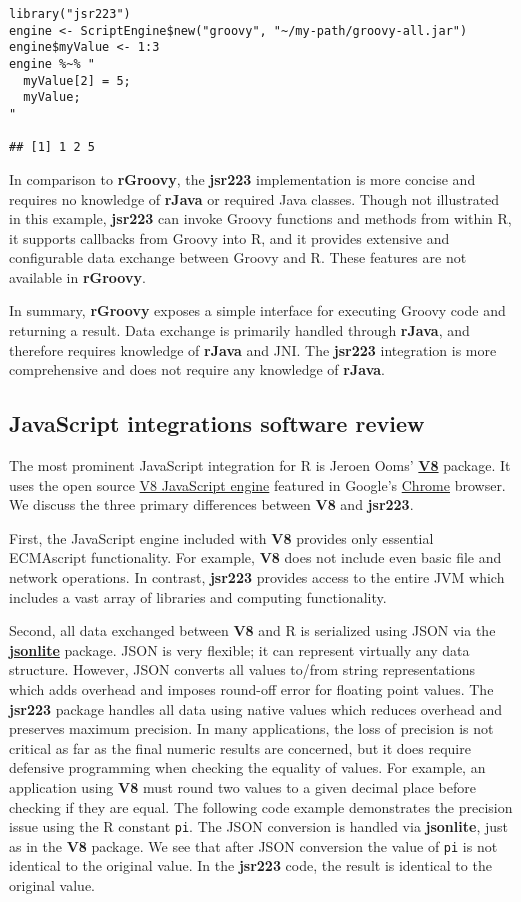 \documentclass[
article,
11pt, %
a4paper, %
oneside, %
headinclude,footinclude, %
]{scrartcl}
\theoremstyle{definition} %
\theoremstyle{plain} %
\theoremstyle{remark} %
\newcommand{\pkg}[1]{\textbf{#1}}
\newcommand{\CRANpkg}[1]{\href{https://CRAN.R-project.org/package=#1}{\pkg{#1}}}
\newcommand{\code}[1]{\texttt{#1}}
\begin{document}
\begin{verbatim}
library("jsr223")
engine <- ScriptEngine$new("groovy", "~/my-path/groovy-all.jar")
engine$myValue <- 1:3
engine %~% "
  myValue[2] = 5;
  myValue;
"

## [1] 1 2 5
\end{verbatim}

In comparison to \pkg{rGroovy}, the \pkg{jsr223} implementation is more concise and requires no knowledge of \pkg{rJava} or required Java classes. Though not illustrated in this example, \pkg{jsr223} can invoke Groovy functions and methods from within R, it supports callbacks from Groovy into R, and it provides extensive and configurable data exchange between Groovy and R. These features are not available in \pkg{rGroovy}.

In summary, \pkg{rGroovy} exposes a simple interface for executing Groovy code and returning a result. Data exchange is primarily handled through \pkg{rJava}, and therefore requires knowledge of \pkg{rJava} and JNI. The \pkg{jsr223} integration is more comprehensive and does not require any knowledge of \pkg{rJava}.

\hypertarget{javascript-integrations}{}
\subsection{JavaScript integrations software review}

The most prominent JavaScript integration for R is Jeroen Ooms' \CRANpkg{V8} package. It uses the open source \href{https://developers.google.com/v8/}{V8 JavaScript engine} featured in Google's \href{https://www.google.com/chrome/browser/features.html}{Chrome} browser. We discuss the three primary differences between \pkg{V8} and \pkg{jsr223}.

First, the JavaScript engine included with \pkg{V8} provides only essential ECMAscript functionality. For example, \pkg{V8} does not include even basic file and network operations. In contrast, \pkg{jsr223} provides access to the entire JVM which includes a vast array of libraries and computing functionality.

Second, all data exchanged between \pkg{V8} and R is serialized using JSON via the \CRANpkg{jsonlite} package. JSON is very flexible; it can represent virtually any data structure. However, JSON converts all values to/from string representations which adds overhead and imposes round-off error for floating point values. The \pkg{jsr223} package handles all data using native values which reduces overhead and preserves maximum precision. In many applications, the loss of precision is not critical as far as the final numeric results are concerned, but it does require defensive programming when checking the equality of values. For example, an application using \pkg{V8} must round two values to a given decimal place before checking if they are equal. The following code example demonstrates the precision issue using the R constant \code{pi}. The JSON conversion is handled via \pkg{jsonlite}, just as in the \pkg{V8} package. We see that after JSON conversion the value of \code{pi} is not identical to the original value. In the \pkg{jsr223} code, the result is identical to the original value.
\end{document}

